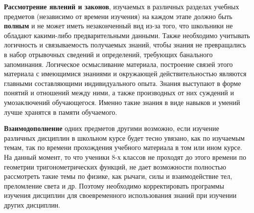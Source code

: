 \textbf{Рассмотрение явлений и законов}, изучаемых в различных разделах учебных предметов (независимо от времени изучения) на каждом этапе должно быть \textbf{полным} и не может иметь незаконченный вид из-за того, что школьники не обладают какими-либо предварительными данными. Также необходимо учитывать логичность и связываемость получаемых знаний, чтобы знания не превращались в набор отрывочных сведений и определений, требующих банального запоминания. Логическое осмысливание материала, построение связей этого материала с имеющимися знаниями и окружающей действительностью являются главными составляющими индивидуального опыта. Знания выступают в форме понятий и отношений между ними, а также производных от них суждений и умозаключений обучающегося. Именно такие знания в виде навыков и умений лучше хранятся в памяти обучаемого.

\textbf{Взаимодополнение} одних предметов другими возможно, если изучение различных дисциплин в школьном курсе будет тесно увязано, как по изучаемым темам, так по времени прохождения учебного материала в том или ином курсе. На данный момент, то что ученики 8-х классов не проходят до этого времени по геометрии тригонометрических функций, не дает возможности полностью рассмотреть такие темы по физике, как рычаги, силы и взаимодействие тел, преломление света и др. Поэтому необходимо корректировать программы изучения дисциплин для своевременного использования знаний при изучении других дисциплин. 

